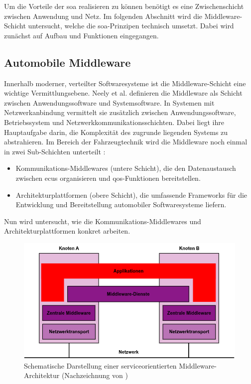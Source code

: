 Um die Vorteile der \gls{soa} realisieren zu können benötigt es eine Zwischenschicht zwischen Anwendung und Netz. Im folgenden Abschnitt wird die Middleware-Schicht untersucht, welche die \gls{soa}-Prinzipen technisch umsetzt. Dabei wird zunächst auf Aufbau und Funktionen eingegangen.

\subsection{Automobile Middleware}
\label{subsect:middle}
Innerhalb moderner, verteilter Softwaresysteme ist die Middleware-Schicht eine wichtige Vermittlungsebene. Neely et al. \cite{neely2006adaptive} definieren die Middleware als Schicht zwischen Anwendungssoftware und Systemsoftware. In Systemen mit Netzwerkanbindung vermittelt sie zusätzlich zwischen Anwendungssoftware, Betriebssystem und Netzwerkkommunikationsschichten. Dabei liegt ihre Hauptaufgabe darin, die Komplexität des zugrunde liegenden Systems zu abstrahieren. Im Bereich der Fahrzeugtechnik wird die Middleware noch einmal in zwei Sub-Schichten unterteilt \cite{kluner2024moderna}:
\begin{itemize}
  \item Kommunikations-Middlewares (untere Schicht), die den Datenaustausch zwischen \glspl{ecu} organisieren und \gls{qos}-Funktionen bereitstellen.
  \item Architekturplattformen (obere Schicht), die umfassende Frameworks für die Entwicklung und Bereitstellung automobiler Softwaresysteme liefern.
\end{itemize}
Nun wird untersucht, wie die Kommunikations-Middlewares und Architekturplattformen konkret arbeiten.

\begin{figure}[h!]
  \centering
  \includegraphics[width=\textwidth]{figures/02Grundlagen/Middleware_Scheme.drawio.png}
  \caption{Schematische Darstellung einer serviceorientierten Middleware-Architektur (Nachzeichnung von \cite{neely2006adaptive})}
  \label{fig:middleware}
\end{figure}

